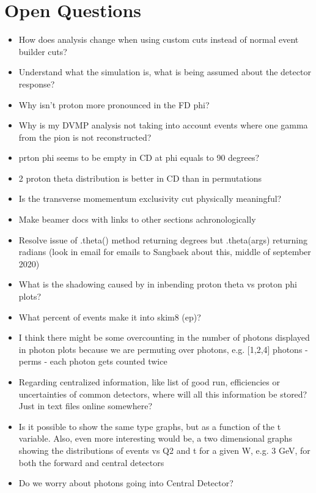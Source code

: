 \section{Open Questions}
\begin{itemize}
    \item How does analysis change when using custom cuts instead of normal event builder cuts?
    \item Understand what the simulation is, what is being assumed about the detector response?
    \item Why isn’t proton more pronounced in the FD phi?
    \item Why is my DVMP analysis not taking into account events where one gamma from the pion is not reconstructed?
    \item prton phi seems to be empty in CD at phi equals to 90 degrees?
    \item 2 proton theta distribution is better in CD than in permutations
    \item Is the transverse momementum exclusivity cut physically meaningful?
    \item Make beamer docs with links to other sections achronologically
    \item Resolve issue of .theta() method returning degrees but .theta(args) returning radians (look in email for emails to Sangbaek about this, middle of september 2020)
    \item What is the shadowing caused by in inbending proton theta vs proton phi plots?
    \item What percent of events make it into skim8 (ep)? 
    \item I think there might be some overcounting in the number of photons displayed in photon plots because we are permuting over photons, e.g. [1,2,4] photons - perms - each photon gets counted twice
    \item Regarding centralized information, like list of good run, efficiencies or uncertainties of common detectors, where will all this information be stored? Just in text files online somewhere?
    \item Is it possible to show the same type graphs, but as a function of the t variable. Also, even more interesting would be, a two dimensional graphs  showing the distributions of events vs Q2 and t  for a given W, e.g. 3 GeV, for both the forward and central detectors
    \item Do we worry about photons going into Central Detector?
\end{itemize}


